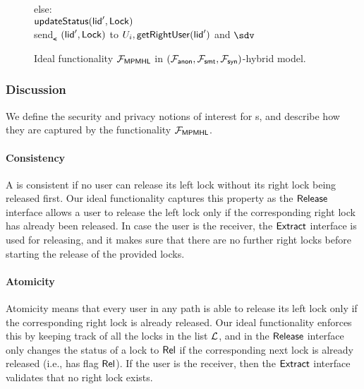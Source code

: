 \begin{figure*}[!h]
{\begin{minipage}[t]{0.45\textwidth}
{				\qquad else:																	\\
				\qquad \quad $\mathsf{updateStatus}(\mathsf{lid}', \mathsf{Lock})$									\\
				\qquad \quad send$_\smt$ $(\mathsf{lid}', \mathsf{Lock})$ to $U_i, \mathsf{getRightUser}(\mathsf{lid}')$ and 
				$\sdv$
			}
			\\
		\end{minipage}
	}
	
	\caption{Ideal functionality $\mathcal{F}_{\mathsf{MPMHL}}$ in $(\mathcal{F}_{\mathsf{anon}}, \mathcal{F}_{\mathsf{smt}}, \mathcal{F}_{\mathsf{syn}})$-hybrid model.}
	\label{fig:ideal-mpmhl}
\end{figure*}


\subsubsection{Discussion}
\label{sec:mpmhl-discussion}

We define the security and privacy notions of interest for {\sysname}s, and describe how they 
are captured by the functionality $\mathcal{F}_{\mathsf{MPMHL}}$.


\paragraph{Consistency} A \sysname is consistent if no user can release its left lock without its 
right lock being released first. Our ideal functionality captures this property as the $\mathsf{Release}$ 
interface allows a user to release the left lock only if the corresponding right lock has already 
been released. In case the user is the receiver, the $\mathsf{Extract}$ interface is used for releasing, 
and it makes sure that there are no further right locks before starting the release of the 
provided locks.


\paragraph{Atomicity} Atomicity means that every user in any path is able to release its left 
lock only if the corresponding right lock is already released. Our ideal functionality enforces 
this by keeping track of all the locks in the list $\mathcal{L}$, and in the $\mathsf{Release}$ interface only 
changes the status of a lock to $\mathsf{Rel}$ if the corresponding next lock is already released (i.e., 
has flag $\mathsf{Rel}$). If the user is the receiver, then the $\mathsf{Extract}$ interface validates that no 
right lock exists.

